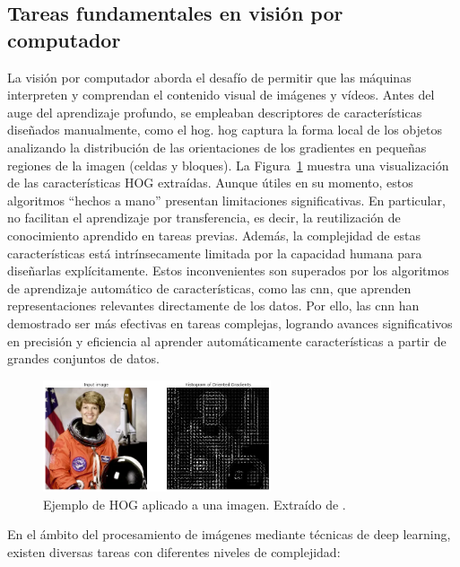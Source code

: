 \documentclass[11pt,spanish,listoffigures,listoftables]{tfgetsinf}
\begin{document}
\subsection{Tareas fundamentales en visión por computador} \label{sec:tareas_fundamentales_vision_por_computador}

La visión por computador aborda el desafío de permitir que las máquinas interpreten y comprendan el contenido visual de imágenes y vídeos. Antes del auge del aprendizaje profundo, se empleaban descriptores de características diseñados manualmente, como el \gls{hog}. \gls{hog} captura la forma local de los objetos analizando la distribución de las orientaciones de los gradientes en pequeñas regiones de la imagen (celdas y bloques). La Figura~\ref{fig:hog} muestra una visualización de las características HOG extraídas. Aunque útiles en su momento, estos algoritmos ``hechos a mano'' presentan limitaciones significativas. En particular, no facilitan el aprendizaje por transferencia, es decir, la reutilización de conocimiento aprendido en tareas previas. Además, la complejidad de estas características está intrínsecamente limitada por la capacidad humana para diseñarlas explícitamente. Estos inconvenientes son superados por los algoritmos de aprendizaje automático de características, como las \gls{cnn}, que aprenden representaciones relevantes directamente de los datos. Por ello, las \gls{cnn} han demostrado ser más efectivas en tareas complejas, logrando avances significativos en precisión y eficiencia al aprender automáticamente características a partir de grandes conjuntos de datos.

\begin{figure}[H]
   \centering
   \includegraphics[width=0.6\textwidth]{images/estado_del_arte/HOG_example.png}
   \caption[Ejemplo de HOG aplicado a una imagen]{Ejemplo de HOG aplicado a una imagen. Extraído de \cite{opengenusHOG}.}
   \label{fig:hog}
\end{figure}


En el ámbito del procesamiento de imágenes mediante técnicas de deep learning, existen diversas tareas con diferentes niveles de complejidad:
\end{document}
